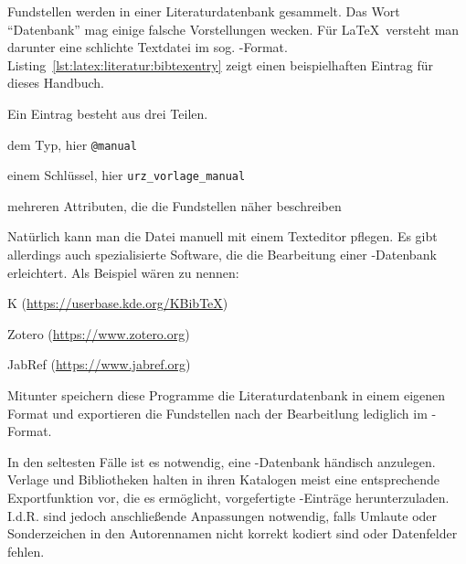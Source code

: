 Fundstellen werden in einer Literaturdatenbank gesammelt. Das Wort
"`Datenbank"' mag einige falsche Vorstellungen wecken. Für \LaTeX\ versteht man
darunter eine schlichte Textdatei im sog. -Format.
Listing~\ref{lst:latex:literatur:bibtexentry} zeigt einen beispielhaften Eintrag für
dieses Handbuch.



Ein Eintrag besteht aus drei Teilen.
%
\begin{compactenum}
\item dem Typ, hier \texttt{@manual}
\item einem Schlüssel, hier \texttt{urz\_vorlage\_manual}
\item mehreren Attributen, die die Fundstellen näher beschreiben
\end{compactenum}

Natürlich kann man die Datei manuell mit einem Texteditor pflegen. Es gibt
allerdings auch spezialisierte Software, die die Bearbeitung einer
-Datenbank erleichtert. Als Beispiel wären zu nennen:
%
\begin{compactitem}
\item K (\url{https://userbase.kde.org/KBibTeX})
\item Zotero (\url{https://www.zotero.org})
\item JabRef (\url{https://www.jabref.org})
\end{compactitem}
%
Mitunter speichern diese Programme die Literaturdatenbank in einem eigenen
Format und exportieren die Fundstellen nach der Bearbeitlung lediglich im
-Format.

In den seltesten Fälle ist es notwendig, eine -Datenbank
händisch anzulegen. Verlage und Bibliotheken halten in ihren Katalogen meist
eine entsprechende Exportfunktion vor, die es ermöglicht, vorgefertigte
-Einträge herunterzuladen. I.d.R. sind jedoch anschließende
Anpassungen notwendig, falls Umlaute oder Sonderzeichen in den Autorennamen
nicht korrekt kodiert sind oder Datenfelder fehlen.
